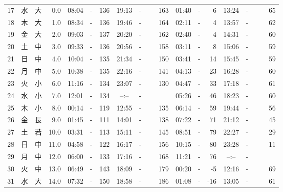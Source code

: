 \documentclass[12pt.a4j]{jsarticle}
\begin{document}
\begin{center}
\begin{table}[ht]
\begin{tabular}{|rc|cr|ccrccr|ccrccr|}
17 & 水 & 大 &  0.0 &  08:04 &-& 136  &  19:13 &-& 163  &   01:40 &-&   6  &   13:24 &-&  65  \\
18 & 木 & 大 &  1.0 &  08:34 &-& 136  &  19:46 &-& 164  &   02:11 &-&   4  &   13:57 &-&  62  \\
19 & 金 & 大 &  2.0 &  09:03 &-& 137  &  20:20 &-& 162  &   02:40 &-&   4  &   14:31 &-&  60  \\
20 & 土 & 中 &  3.0 &  09:33 &-& 136  &  20:56 &-& 158  &   03:11 &-&   8  &   15:06 &-&  59  \\
21 & 日 & 中 &  4.0 &  10:04 &-& 135  &  21:34 &-& 150  &   03:41 &-&  14  &   15:45 &-&  59  \\
22 & 月 & 中 &  5.0 &  10:38 &-& 135  &  22:16 &-& 141  &   04:13 &-&  23  &   16:28 &-&  60  \\
23 & 火 & 小 &  6.0 &  11:16 &-& 134  &  23:07 &-& 130  &   04:47 &-&  33  &   17:18 &-&  61  \\
24 & 水 & 小 &  7.0 &  12:01 &-& 134  &  --:-- &-&~~~~~~&   05:26 &-&  46  &   18:23 &-&  60  \\
25 & 木 & 小 &  8.0 &  00:14 &-& 119  &  12:55 &-& 135  &   06:14 &-&  59  &   19:44 &-&  56  \\
26 & 金 & 長 &  9.0 &  01:45 &-& 111  &  14:01 &-& 138  &   07:22 &-&  71  &   21:12 &-&  45  \\
27 & 土 & 若 & 10.0 &  03:31 &-& 113  &  15:11 &-& 145  &   08:51 &-&  79  &   22:27 &-&  29  \\
28 & 日 & 中 & 11.0 &  04:58 &-& 122  &  16:17 &-& 156  &   10:15 &-&  80  &   23:28 &-&  11  \\
29 & 月 & 中 & 12.0 &  06:00 &-& 133  &  17:16 &-& 168  &   11:21 &-&  76  &   --:-- &-&~~~~~~\\
30 & 火 & 中 & 13.0 &  06:49 &-& 143  &  18:09 &-& 179  &   00:20 &-&  -5  &   12:16 &-&  69  \\
31 & 水 & 大 & 14.0 &  07:32 &-& 150  &  18:58 &-& 186  &   01:08 &-& -16  &   13:05 &-&  61  \\
   \hline
   \end{tabular}
\end{table}
\newpage
\end{center}
\end{document}
